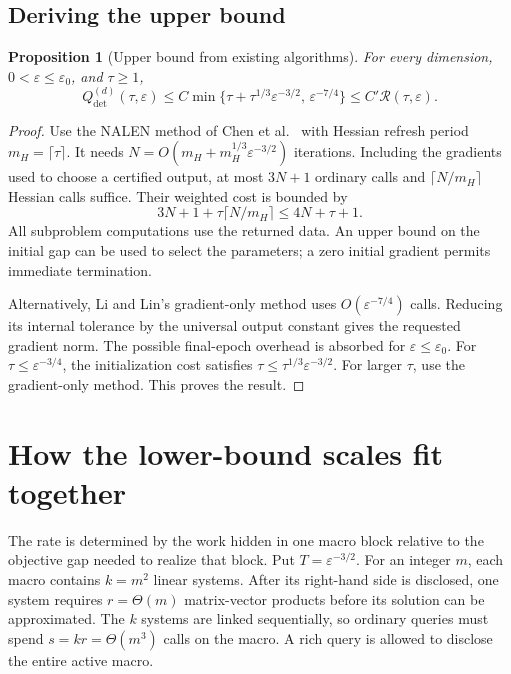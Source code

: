 \documentclass[11pt]{article}
\newtheorem{proposition}[theorem]{Proposition}
\theoremstyle{definition}
\theoremstyle{remark}
\newcommand{\eps}{\varepsilon}
\newcommand{\Qdet}{Q_{\mathrm{det}}}
\newcommand{\Rate}{\mathcal R}
\begin{document}
\subsection{Deriving the upper bound}
\begin{proposition}[Upper bound from existing algorithms]\label{prop:upper}
For every dimension, $0<\eps\le\eps_0$, and $\tau\ge1$,
\[
 \Qdet^{(d)}(\tau,\eps)
 \le C\min\{\tau+\tau^{1/3}\eps^{-3/2},\,\eps^{-7/4}\}
 \le C'\Rate(\tau,\eps).
\]
\end{proposition}
\begin{proof}
Use the NALEN method of Chen et al.\ \cite[Theorem 4.1 and Algorithm 1]{chen}
with Hessian refresh period $m_H=\lceil\tau\rceil$.
It needs
$N=O(m_H+m_H^{1/3}\eps^{-3/2})$ iterations.
Including the gradients used to choose a certified output, at most
$3N+1$ ordinary calls and $\lceil N/m_H\rceil$ Hessian calls suffice.
Their weighted cost is bounded by
\[
 3N+1+\tau\lceil N/m_H\rceil\le4N+\tau+1.
\]
All subproblem computations use the returned data. An upper bound on
the initial gap can be used to select the parameters; a zero initial
gradient permits immediate termination.

Alternatively, Li and Lin's gradient-only method \cite[Theorem 1]{lilin}
uses $O(\eps^{-7/4})$ calls. Reducing its internal tolerance by the
universal output constant gives the requested gradient norm.
The possible final-epoch overhead is absorbed for $\eps\le\eps_0$.
For $\tau\le\eps^{-3/4}$, the initialization cost satisfies
$\tau\le\tau^{1/3}\eps^{-3/2}$. For larger $\tau$, use the
gradient-only method. This proves the result.
\end{proof}

\section{How the lower-bound scales fit together}\label{sec:overview}
The rate is determined by the work hidden in one macro block relative
to the objective gap needed to realize that block. Put $T=\eps^{-3/2}$.
For an integer $m$, each macro contains $k=m^2$ linear systems.
After its right-hand side is disclosed, one system requires
$r=\Theta(m)$ matrix-vector products before its solution can be
approximated. The $k$ systems are linked sequentially, so ordinary
queries must spend $s=kr=\Theta(m^3)$ calls on the macro. A rich query
is allowed to disclose the entire active macro.
\end{document}
